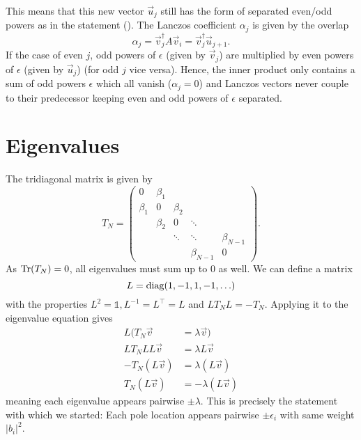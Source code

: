 This means that this new vector $\vec{u}_j$ still has the form of separated even/odd powers
as in the statement ().
The Lanczos coefficient $\alpha_j$ is given by the overlap
\begin{equation}
    \alpha_j
    =
    \vec{v}_j^\dagger A \vec{v}_i
    =
    \vec{v}_j^\dagger \vec{u}_{j+1}.
\end{equation}
If the case of even $j$, odd powers of $\epsilon$ (given by $\vec{v}_j$)
are multiplied by even powers of $\epsilon$ (given by $\vec{u}_j$)
(for odd $j$ vice versa).
Hence, the inner product only contains a sum of odd powers $\epsilon$ which all vanish
($\alpha_j = 0$)
and Lanczos vectors never couple to their predecessor
keeping even and odd powers of $\epsilon$ separated.

\section{Eigenvalues}

The tridiagonal matrix is given by
\begin{equation}
    T_N
    =
    \begin{pmatrix}
        0       & \beta_1 &         &             &             \\
        \beta_1 & 0       & \beta_2 &             &             \\
                & \beta_2 & 0       & \ddots      &             \\
                &         & \ddots  & \ddots      & \beta_{N-1} \\
                &         &         & \beta_{N-1} & 0
    \end{pmatrix}.
\end{equation}
As $\operatorname{Tr}(T_N) = 0$, all eigenvalues must sum up to $0$ as well.
We can define a matrix
\begin{equation}
    L = \operatorname{diag}(1, -1, 1, -1, \ldots)
\end{equation}
with the properties $L^2 = \mathbb{1}, L^{-1} = L^\intercal = L$ and $L T_N L = -T_N$.
Applying it to the eigenvalue equation gives
\begin{align}
    L(T_N \vec{v}   & = \lambda \vec{v})    \\
    LT_N LL\vec{v}  & = \lambda L\vec{v}    \\
    -T_N (L\vec{v}) & = \lambda (L\vec{v})  \\
    T_N (L\vec{v})  & = -\lambda (L\vec{v})
\end{align}
meaning each eigenvalue appears pairwise $\pm\lambda$.
This is precisely the statement with which we started:
Each pole location appears pairwise $\pm\epsilon_i$ with same weight $|b_i|^2$.
